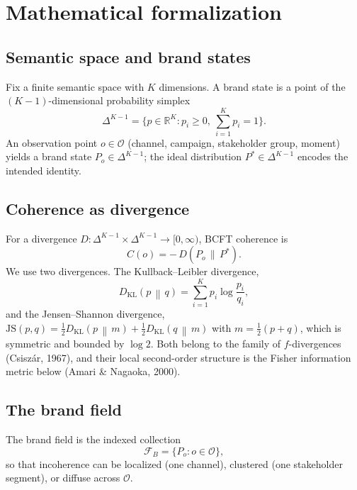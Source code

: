 \documentclass[11pt]{article}
\theoremstyle{remark}
\newcommand{\Pstar}{P^{*}}
\newcommand{\KL}[2]{D_{\mathrm{KL}}\!\left(#1 \,\middle\|\, #2\right)}
\newcommand{\FB}{\mathcal{F}_{B}}
\newcommand{\Obs}{\mathcal{O}}
\begin{document}
\section{Mathematical formalization}
\label{sec:formal}

\subsection{Semantic space and brand states}
Fix a finite semantic space with $K$ dimensions. A brand state is a point of the
$(K-1)$-dimensional probability simplex
\begin{equation}
\Delta^{K-1} = \Big\{ p \in \mathbb{R}^{K} : p_i \ge 0,\ \textstyle\sum_{i=1}^{K} p_i = 1 \Big\}.
\end{equation}
An observation point $o \in \Obs$ (channel, campaign, stakeholder group, moment)
yields a brand state $P_o \in \Delta^{K-1}$; the ideal distribution
$\Pstar \in \Delta^{K-1}$ encodes the intended identity.

\subsection{Coherence as divergence}
For a divergence $D:\Delta^{K-1}\times\Delta^{K-1}\to[0,\infty)$, BCFT coherence
is
\begin{equation}
C(o) = -\,D\!\left(P_o \,\|\, \Pstar\right).
\label{eq:coh}
\end{equation}
We use two divergences. The Kullback--Leibler divergence,
\begin{equation}
\KL{p}{q} = \sum_{i=1}^{K} p_i \log \frac{p_i}{q_i},
\label{eq:kl}
\end{equation}
and the Jensen--Shannon divergence, $\mathrm{JS}(p,q) = \tfrac12\KL{p}{m} +
\tfrac12\KL{q}{m}$ with $m=\tfrac12(p+q)$, which is symmetric and bounded by
$\log 2$. Both belong to the family of $f$-divergences (Csisz\'ar, 1967), and
their local second-order structure is the Fisher information metric below
(Amari \& Nagaoka, 2000).

\subsection{The brand field}
The brand field is the indexed collection
\begin{equation}
\FB = \{P_o : o \in \Obs\},
\label{eq:field}
\end{equation}
so that incoherence can be localized (one channel), clustered (one stakeholder
segment), or diffuse across $\Obs$.
\end{document}
